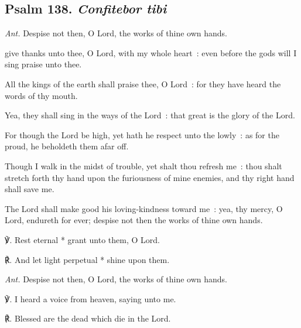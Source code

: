 \subsection{Psalm 138. \textit{Confitebor tibi}}\noindent
\textit{Ant.} Despise not then, {\dag} O Lord, the works of thine own hands.\par
{} give thanks unto thee, O Lord, with my whole heart~: even before the gods will I sing praise unto thee.\par
{}
All the kings of the earth shall praise thee, O Lord~: for they have heard the words of thy mouth.\par
{}Yea, they shall sing in the ways of the Lord~: that great is the glory of the Lord.\par
{}For though the Lord be high, yet hath he respect unto the lowly~: as for the proud, he beholdeth them afar off.\par
{}Though I walk in the midst of trouble, yet shalt thou refresh me~: thou shalt stretch forth thy hand upon the furiousness of mine enemies, and thy right hand shall save me.\par
{}The Lord shall make good his loving-kindness toward me~: yea, thy mercy, O Lord, endureth for ever; despise not then the works of thine own hands.
\par
℣. Rest eternal * grant unto them, O Lord.\par
℟. And let light perpetual * shine upon them.\par\noindent
\textit{Ant.} Despise not then, O Lord, the works of thine own hands.\par
\vspace{0.5\baselineskip}
℣. I heard a voice from heaven, saying unto me.\par 
℟. Blessed are the dead which die in the Lord.\par
